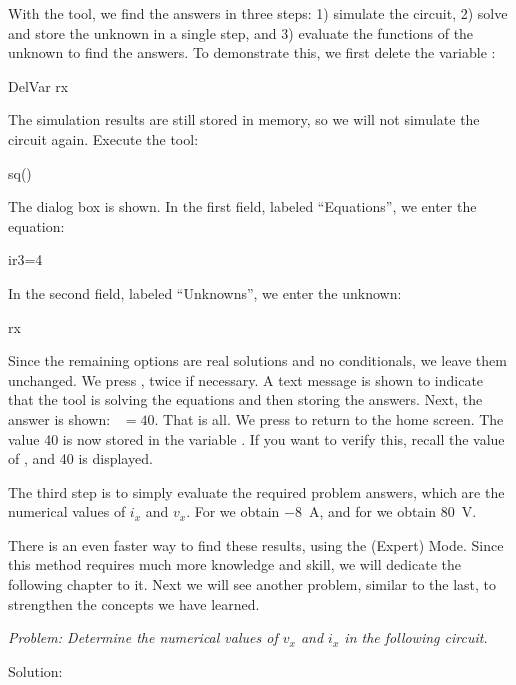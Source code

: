 With the  tool, we find the answers in three steps: 1)
simulate the circuit, 2) solve and store the unknown in a single
step, and 3) evaluate the functions of the unknown to find the
answers. To demonstrate this, we first delete the variable
:

\begin{entry}
DelVar rx
\end{entry}

The simulation results are still stored in memory, so we will not
simulate the circuit again. Execute the  tool:

\begin{entry}
sq\solves()
\end{entry}

The dialog box is shown. In the first field, labeled ``Equations'',
we enter the equation:

\begin{entry}
ir3=4
\end{entry}

In the second field, labeled ``Unknowns'', we enter the unknown:

\begin{entry}
rx
\end{entry}

Since the remaining options are real solutions and no conditionals,
we leave them unchanged. We press , twice if necessary. A
text message is shown to indicate that the tool is solving the
equations and then storing the answers. Next, the answer is shown:
~$= 40$. That is all. We press  to return to the
home screen. The value 40 is now stored in the variable .
If you want to verify this, recall the value of , and 40 is
displayed.

The third step is to simply evaluate the required problem answers,
which are the numerical values of $i_x$ and $v_x$. For  we
obtain $-8$~A, and for  we obtain 80~V.

There is an even faster way to find these results, using the
(Expert) Mode. Since this method requires much more knowledge and
skill, we will dedicate the following chapter to it. Next we will
see another problem, similar to the last, to strengthen the concepts
we have learned.


\emph{Problem: Determine the numerical values of $v_x$ and $i_x$ in
the following circuit.}

Solution:

